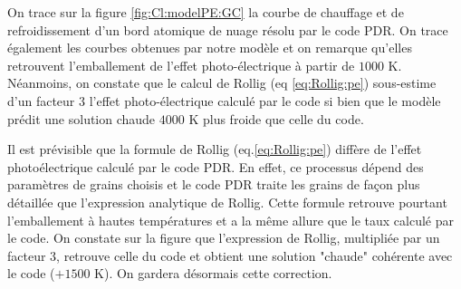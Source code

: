 On trace sur la figure \ref{fig:Cl:modelPE:GC} la courbe de chauffage et de refroidissement d'un bord atomique de nuage résolu par le code PDR. On trace également les courbes obtenues par notre modèle et on remarque qu'elles retrouvent l'emballement de l'effet photo-électrique à partir de $1000$ K. Néanmoins, on constate que le calcul de Rollig (eq \ref{eq:Rollig:pe}) sous-estime d'un facteur 3 l'effet photo-électrique calculé par le code si bien que le modèle prédit une solution \og chaude \fg{} $4000$ K plus froide que celle du code. \newline 

Il est prévisible que la formule de Rollig (eq.\ref{eq:Rollig:pe}) diffère de l'effet photoélectrique calculé par le code PDR. En effet, ce processus dépend des paramètres de grains choisis et le code PDR traite les grains de façon plus détaillée que l'expression analytique de Rollig. Cette formule retrouve pourtant l'emballement à hautes températures et a la même allure que le taux calculé par le code. On constate sur la figure \label{fig:Cl:modelPE:GC3} que l'expression de Rollig, multipliée par un facteur 3, retrouve celle du code et obtient une solution "chaude" cohérente avec le code ($+1500$ K). On gardera désormais cette correction. 


